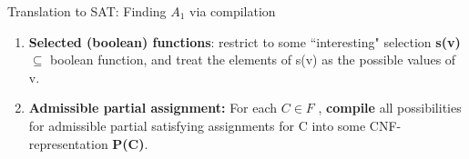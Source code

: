 \documentclass[xcolor=table	]{beamer}
\begin{document}
%

\begin{frame}{Translation to SAT: Finding $A_1$ via compilation}
\begin{enumerate}
    \item \textbf{Selected (boolean) functions}: restrict to some ``interesting" selection \textbf{s(v)} $\subseteq$ boolean function, and treat the elements of s(v) as the possible values of v. \newline 
    
    \item \textbf{Admissible partial assignment:} For each $C \in F$ , \textbf{compile} all possibilities for admissible partial satisfying assignments for C into some CNF-representation \textbf{P(C)}.
\end{enumerate}

\end{frame}

%  
% 
%
%
% 
\end{document}
